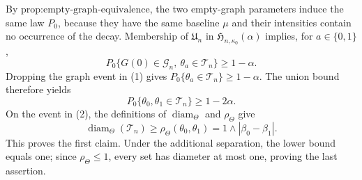 By \(\text{prop:empty-graph-equivalence}\), the two empty-graph parameters induce the same law \(P_0\), because they have the same baseline \(\mu\) and their intensities contain no occurrence of the decay.  Membership of \(\mathfrak U_n\) in \(\mathfrak H_{n,\kappa_0}(\alpha)\) implies, for \(a\in\{0,1\}\),
\[
 P_0\{G(0)\in\mathcal G_n,\ \theta_a\in\mathcal T_n\}\geq1-\alpha.
\tag{1}
\]
Dropping the graph event in (1) gives \(P_0\{\theta_a\in\mathcal T_n\}\geq1-\alpha\).  The union bound therefore yields
\[
 P_0\{\theta_0,\theta_1\in\mathcal T_n\}\geq1-2\alpha.
\tag{2}
\]
On the event in (2), the definitions of \(\operatorname{diam}_\Theta\) and \(\rho_\Theta\) give
\[
 \operatorname{diam}_\Theta(\mathcal T_n)
 \geq\rho_\Theta(\theta_0,\theta_1)
 =1\wedge|\beta_0-\beta_1|.
\]
This proves the first claim.  Under the additional separation, the lower bound equals one; since \(\rho_\Theta\leq1\), every set has diameter at most one, proving the last assertion.